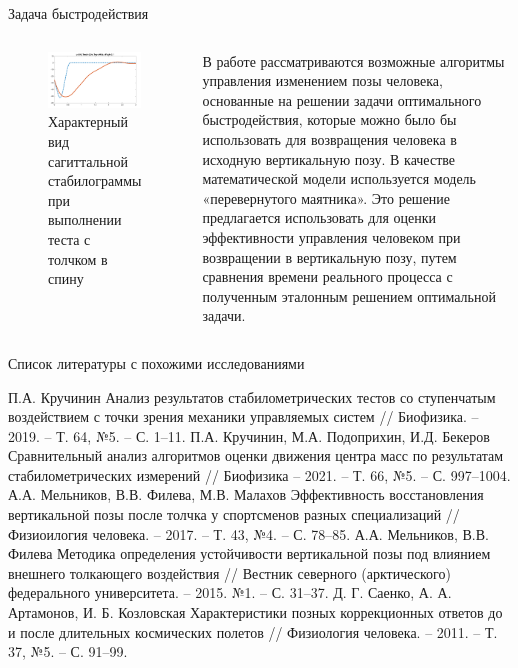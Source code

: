 \documentclass[10pt]{beamer}
\begin{document}
\begin{frame}{Задача быстродействия}
	\begin{columns}
		\begin{figure}[h!]
			\includegraphics[width=1\linewidth]{images/trajectory.png}
			\caption{Характерный вид сагиттальной стабилограммы при выполнении теста с толчком в спину}
		\end{figure}
		В работе рассматриваются возможные алгоритмы управления изменением
		позы человека, основанные на решении задачи оптимального быстродействия,
		которые можно было бы использовать для возвращения человека в исходную
		вертикальную позу. В качестве математической модели используется модель
		«перевернутого маятника». Это решение предлагается использовать для
		оценки эффективности управления человеком при возвращении в
		вертикальную позу, путем сравнения времени реального процесса с полученным
		эталонным решением оптимальной задачи.
	\end{columns}
\end{frame}

\begin{frame}[shrink=8]{Список литературы с похожими исследованиями}
	\begin{thebibliography}{15}
		П.А. Кручинин Анализ результатов стабилометрических тестов со ступенчатым воздействием с точки зрения механики управляемых систем
		// Биофизика. – 2019. – Т. 64, №5. – С. 1–11.
		П.А. Кручинин, М.А. Подоприхин, И.Д. Бекеров Сравнительный анализ алгоритмов оценки движения центра масс по результатам стабилометрических измерений // Биофизика – 2021. – Т. 66, №5. – С. 997–1004.
		А.А. Мельников, В.В. Филева, М.В. Малахов Эффективность восстановления вертикальной позы
		после толчка у спортсменов разных специализаций // Физиоилогия человека. – 2017. – Т. 43, №4. – С. 78–85.
		А.А. Мельников, В.В. Филева Методика определения устойчивости вертикальной позы под влиянием
		внешнего толкающего воздействия // Вестник северного (арктического) федерального университета. – 2015. №1. – С. 31–37.
		Д. Г. Саенко, А. А. Артамонов, И. Б. Козловская Характеристики позных коррекционных ответов
		до и после длительных космических полетов // Физиология человека. – 2011. – Т. 37, №5. – С. 91–99.
	\end{thebibliography}
\end{frame}
\end{document}
